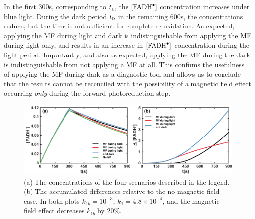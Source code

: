 \documentclass[twoside,twocolumn,9pt]{article}
\begin{document}
In the first 300s, corresponding to $t_{\textsc{l}}$, the $[\ce{FADH^{.}}]$ concentration increases under blue light. During the dark period $t_{\textsc{d}}$ in the remaining 600s, the concentrations reduce, but the time is not sufficient for complete re-oxidation. As expected, applying the MF during light and dark is indistinguishable from applying the MF during light only, and results in an increase in $[\ce{FADH^{.}}]$ concentration during the light period. Importantly, and also as expected, applying the MF during the dark is indistinguishable from not applying a MF at all. This confirms the usefulness of applying the MF during dark as a diagnostic tool and allows us to conclude that the results \cite{Pooam2019} cannot be reconciled with the possibility of a magnetic field effect occurring \emph{only} during the forward photoreduction step.
\begin{figure}[h]
	\centering
	\includegraphics{concAndAccDiff.pdf}
	\caption{(a) The concentrations of the four scenarios described in the legend. (b) The accumulated differences relative to the no magnetic field case. In both plots $k_{1b} = 10^{-3}$, $k_{1} = 4.8 \times 10^{-4}$, and the magnetic field effect decreases $k_{1b}$ by 20\%.}
	\label{fig:concAndAccDiff}
\end{figure}
\end{document}
